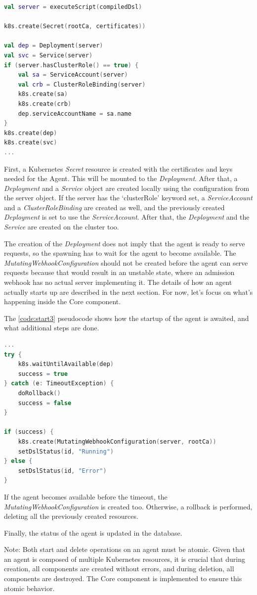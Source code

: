 \begin{lstlisting}[caption={Spawning of an agent},language=Kotlin,label=code:start2]
val server = executeScript(compiledDsl)

k8s.create(Secret(rootCa, certificates))

val dep = Deployment(server)
val svc = Service(server)
if (server.hasClusterRole() == true) {
    val sa = ServiceAccount(server)
    val crb = ClusterRoleBinding(server)
    k8s.create(sa)
    k8s.create(crb)
    dep.serviceAccountName = sa.name
}
k8s.create(dep)
k8s.create(svc)
...
\end{lstlisting}

First, a Kubernetes \emph{Secret} resource is created with the certificates and keys needed for the Agent. This will be mounted to the \emph{Deployment}.
After that, a \emph{Deployment} and a \emph{Service} object are created locally using the configuration from the server object. If the server has the `clusterRole' keyword set, a \emph{ServiceAccount} and a \emph{ClusterRoleBinding} are created as well, and the previously created \emph{Deployment} is set to use the \emph{ServiceAccount}. After that, the \emph{Deployment} and the \emph{Service} are created on the cluster too.

The creation of the \emph{Deployment} does not imply that the agent is ready to serve requests, so the spawning has to wait for the agent to become available. The \emph{MutatingWebhookConfiguration} should not be created before the agent can serve requests because that would result in an unstable state, where an admission webhook has no actual server implementing it. The details of how an agent actually starts up are described in the next section. For now, let's focus on what's happening inside the Core component.

The \ref{code:start3} pseudocode shows how the startup of the agent is awaited, and what additional steps are done.

\begin{lstlisting}[caption={Spawning of an agent},language=Kotlin,label=code:start3]
...
try {
    k8s.waitUntilAvailable(dep)
    success = true
} catch (e: TimeoutException) {
    doRollback()
    success = false
}
        
if (success) {
    k8s.create(MutatingWebhookConfiguration(server, rootCa))
    setDslStatus(id, "Running")
} else {
    setDslStatus(id, "Error")
}
\end{lstlisting}

If the agent becomes available before the timeout, the \emph{MutatingWebhookConfiguration} is created too. Otherwise, a rollback is performed, deleting all the previously created resources.

Finally, the status of the agent is updated in the database.

Note: Both start and delete operations on an agent must be atomic. Given that an agent is composed of multiple Kubernetes resources, it is crucial that during creation, all components are created without errors, and during deletion, all components are destroyed. The Core component is implemented to ensure this atomic behavior.
